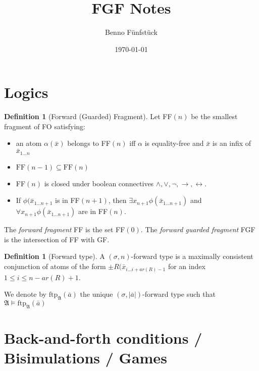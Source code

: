 \documentclass[draft]{scrartcl}
\title{FGF Notes}
\author{Benno Fünfstück}
\date{\today}
\theoremstyle{definition}
\newtheorem{definition}[theorem]{Definition}
\begin{document}
\maketitle

\section{Logics}

\begin{definition}[Forward (Guarded) Fragment]
Let FF$(n)$ be the smallest fragment of FO satisfying:

\begin{itemize}
  \item an atom $\alpha(\bar{x})$ belongs to FF$(n)$ iff $\alpha$ is equality-free and $\bar{x}$ is an infix of $\bar{x}_{1\ldots{}n}$
  \item $\mathrm{FF}(n-1) \subseteq \mathrm{FF}(n)$
  \item FF$(n)$ is closed under boolean connectives $\land, \lor, \neg, \rightarrow, \leftrightarrow$.
  \item If $\phi(\bar{x}_{1\ldots{}n+1}$ is in FF$(n+1)$, then $\exists{x_{n+1}}\phi(\bar{x}_{1\ldots{}n+1})$ and $\forall{x_{n+1}}\phi(\bar{x}_{1\ldots{}n+1})$ are in FF$(n)$.
\end{itemize}

The \emph{forward fragment} FF is the set FF$(0)$.
The \emph{forward guarded fragment} FGF is the intersection of FF with GF.
\end{definition}

\begin{definition}[Forward type]
A $(\sigma,n)$-forward type is a maximally consistent conjunction of atoms of the form $\pm{}R(\bar{x}_{i\ldots{}i+ar(R)-1}$ for an index $1 \leq i \leq n - ar(R) + 1$.
\end{definition}

We denote by $\mathrm{ftp}_\mathfrak{A}(\bar{a})$ the unique $(\sigma,|\bar{a}|)$-forward type such that $\mathfrak{A} \models \mathrm{ftp}_\mathfrak{A}(\bar{a})$

\section{Back-and-forth conditions / Bisimulations / Games}
\end{document}
